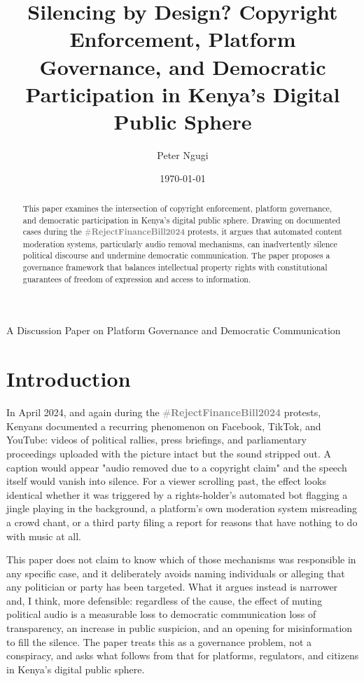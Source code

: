 \documentclass{article}
\title{Silencing by Design? Copyright Enforcement, Platform Governance, and Democratic Participation in Kenya's Digital Public Sphere}
\author{Peter Ngugi}
\date{\today}
\newcommand{\rejectbill}{\textcolor{gray}{\#\textbf{RejectFinanceBill2024}}}
\begin{document}
\maketitle

\begin{center}
\large A Discussion Paper on Platform Governance and Democratic Communication
\end{center}

\vspace{0.5cm}

\begin{abstract}
This paper examines the intersection of copyright enforcement, platform governance, and democratic participation in Kenya's digital public sphere. Drawing on documented cases during the \rejectbill{} protests, it argues that automated content moderation systems, particularly audio removal mechanisms, can inadvertently silence political discourse and undermine democratic communication. The paper proposes a governance framework that balances intellectual property rights with constitutional guarantees of freedom of expression and access to information.
\end{abstract}

\section{Introduction}

In April 2024, and again during the \rejectbill{} protests, Kenyans documented a recurring phenomenon on Facebook, TikTok, and YouTube: videos of political rallies, press briefings, and parliamentary proceedings uploaded with the picture intact but the sound stripped out. A caption would appear "audio removed due to a copyright claim" and the speech itself would vanish into silence. For a viewer scrolling past, the effect looks identical whether it was triggered by a rights-holder's automated bot flagging a jingle playing in the background, a platform's own moderation system misreading a crowd chant, or a third party filing a report for reasons that have nothing to do with music at all.

This paper does not claim to know which of those mechanisms was responsible in any specific case, and it deliberately avoids naming individuals or alleging that any politician or party has been targeted. What it argues instead is narrower and, I think, more defensible: regardless of the cause, the effect of muting political audio is a measurable loss to democratic communication loss of transparency, an increase in public suspicion, and an opening for misinformation to fill the silence. The paper treats this as a governance problem, not a conspiracy, and asks what follows from that for platforms, regulators, and citizens in Kenya's digital public sphere.
\end{document}
